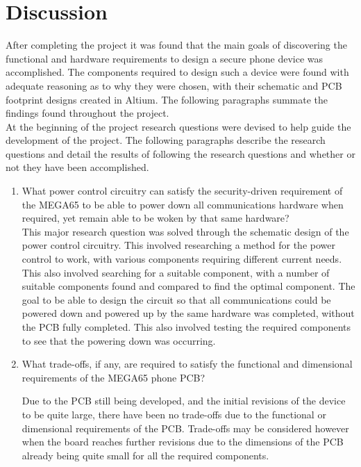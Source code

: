 
\chapter{Discussion} %

\label{Chapter7} %


	After completing the project it was found that the main goals of discovering the functional and hardware requirements to design a secure phone device was accomplished. The components required to design such a device were found with adequate reasoning as to why they were chosen, with their schematic and PCB footprint designs created in Altium. The following paragraphs summate the findings found throughout the project.\\

	At the beginning of the project research questions were devised to help guide the development of the project. The following paragraphs describe the research questions and detail the results of following the research questions and whether or not they have been accomplished.\\

\begin{enumerate}
\item What power control circuitry can satisfy the security-driven requirement of the MEGA65 to be able to power down all communications hardware when required, yet remain able to be woken by that same hardware?\\

	This major research question was solved through the schematic design of the power control circuitry. This involved researching a method for the power control to work, with various components requiring different current needs. This also involved searching for a suitable component, with a number of suitable components found and compared to find the optimal component. The goal to be able to design the circuit so that all communications could be powered down and powered up by the same hardware was completed, without the PCB fully completed. This also involved testing the required components to see that the powering down was occurring.
	
\item What trade-offs, if any, are required to satisfy the functional and dimensional requirements of the MEGA65 phone PCB?


	Due to the PCB still being developed, and the initial revisions of the device to be quite large, there have been no trade-offs due to the functional or dimensional requirements of the PCB. Trade-offs may be considered however when the board reaches further revisions due to the dimensions of the PCB already being quite small for all the required components. 

\end{enumerate}






